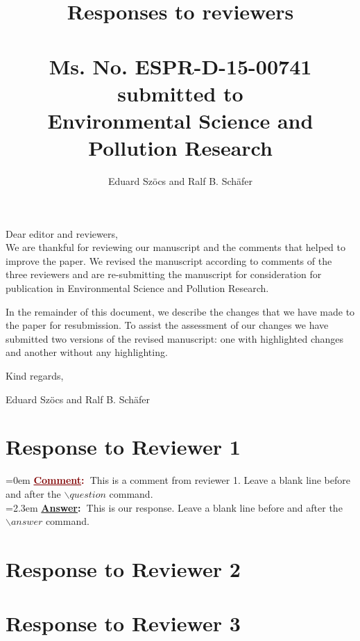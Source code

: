 \documentclass{article}
\newcommand{\question}[0]{\vspace{1em} \noindent \hangindent=0em \textbf{\textcolor{Maroon}{\uline{Comment}:~}}}
\newcommand{\answer}[0]{\\\vspace{0.1em} \hangindent=2.3em \textbf{\textcolor{NavyBlue}{\uline{Answer}:~}}}
\begin{document}
\title{Responses to reviewers\\~\\Ms. No. ESPR-D-15-00741\\submitted to\\Environmental Science and Pollution Research}

\author{Eduard Szöcs and Ralf B. Schäfer}

\maketitle
\noindent Dear editor and reviewers,\\

We are thankful for reviewing our manuscript and the comments that helped to improve the paper. 
We revised the manuscript according to comments of the three reviewers and are re-submitting the manuscript for consideration for publication in Environmental Science and Pollution Research. 

In the remainder of this document, we describe the changes that we have made to the paper for resubmission. To assist the assessment of our changes we have submitted two versions of the revised manuscript: one with highlighted changes and another without any highlighting.

\vspace{2em}
\hfill Kind regards,

\hfill Eduard Szöcs and Ralf B. Schäfer

\newpage
\section{Response to Reviewer 1}

\question This is a comment from reviewer 1. Leave a blank line before and after the $\backslash question$ command.
\answer This is our response. Leave a blank line before and after the $\backslash answer$ command.

\section{Response to Reviewer 2}




\section{Response to Reviewer 3}


\end{document}
